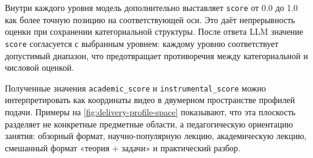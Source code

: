 Внутри каждого уровня модель дополнительно выставляет \texttt{score} от 0.0 до 1.0
как более точную позицию на соответствующей оси. Это даёт непрерывность оценки
при сохранении категориальной структуры. После ответа LLM значение \texttt{score}
согласуется с выбранным уровнем: каждому уровню соответствует допустимый диапазон,
что предотвращает противоречия между категориальной и числовой оценкой.

Полученные значения \texttt{academic\_score} и \texttt{instrumental\_score}
можно интерпретировать как координаты видео в двумерном пространстве профилей подачи.
Примеры на \cref{fig:delivery-profile-space} показывают, что эта плоскость
разделяет не конкретные предметные области, а педагогическую ориентацию занятия:
обзорный формат, научно-популярную лекцию, академическую лекцию,
смешанный формат «теория + задачи» и практический разбор.

